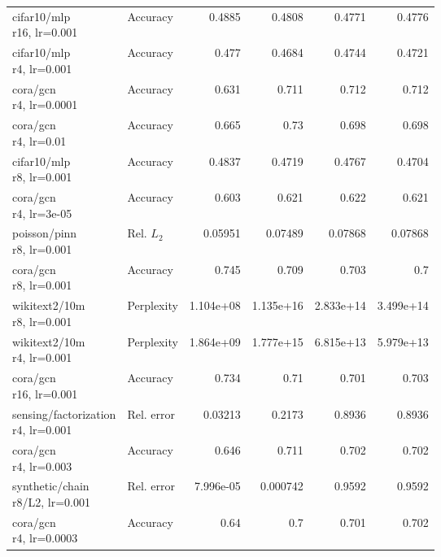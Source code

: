 \begin{longtable}{p{.31\linewidth}p{.13\linewidth}rrrr}
\shortstack[l]{cifar10/mlp\\r16, lr=0.001} & Accuracy & 0.4885 & 0.4808 & 0.4771 & 0.4776\\
\shortstack[l]{cifar10/mlp\\r4, lr=0.001} & Accuracy & 0.477 & 0.4684 & 0.4744 & 0.4721\\
\shortstack[l]{cora/gcn\\r4, lr=0.0001} & Accuracy & 0.631 & 0.711 & 0.712 & 0.712\\
\shortstack[l]{cora/gcn\\r4, lr=0.01} & Accuracy & 0.665 & 0.73 & 0.698 & 0.698\\
\shortstack[l]{cifar10/mlp\\r8, lr=0.001} & Accuracy & 0.4837 & 0.4719 & 0.4767 & 0.4704\\
\shortstack[l]{cora/gcn\\r4, lr=3e-05} & Accuracy & 0.603 & 0.621 & 0.622 & 0.621\\
\shortstack[l]{poisson/pinn\\r8, lr=0.001} & Rel. $L_2$ & 0.05951 & 0.07489 & 0.07868 & 0.07868\\
\shortstack[l]{cora/gcn\\r8, lr=0.001} & Accuracy & 0.745 & 0.709 & 0.703 & 0.7\\
\shortstack[l]{wikitext2/10m\\r8, lr=0.001} & Perplexity & 1.104e+08 & 1.135e+16 & 2.833e+14 & 3.499e+14\\
\shortstack[l]{wikitext2/10m\\r4, lr=0.001} & Perplexity & 1.864e+09 & 1.777e+15 & 6.815e+13 & 5.979e+13\\
\shortstack[l]{cora/gcn\\r16, lr=0.001} & Accuracy & 0.734 & 0.71 & 0.701 & 0.703\\
\shortstack[l]{sensing/factorization\\r4, lr=0.001} & Rel. error & 0.03213 & 0.2173 & 0.8936 & 0.8936\\
\shortstack[l]{cora/gcn\\r4, lr=0.003} & Accuracy & 0.646 & 0.711 & 0.702 & 0.702\\
\shortstack[l]{synthetic/chain\\r8/L2, lr=0.001} & Rel. error & 7.996e-05 & 0.000742 & 0.9592 & 0.9592\\
\shortstack[l]{cora/gcn\\r4, lr=0.0003} & Accuracy & 0.64 & 0.7 & 0.701 & 0.702\\
\bottomrule
\end{longtable}
